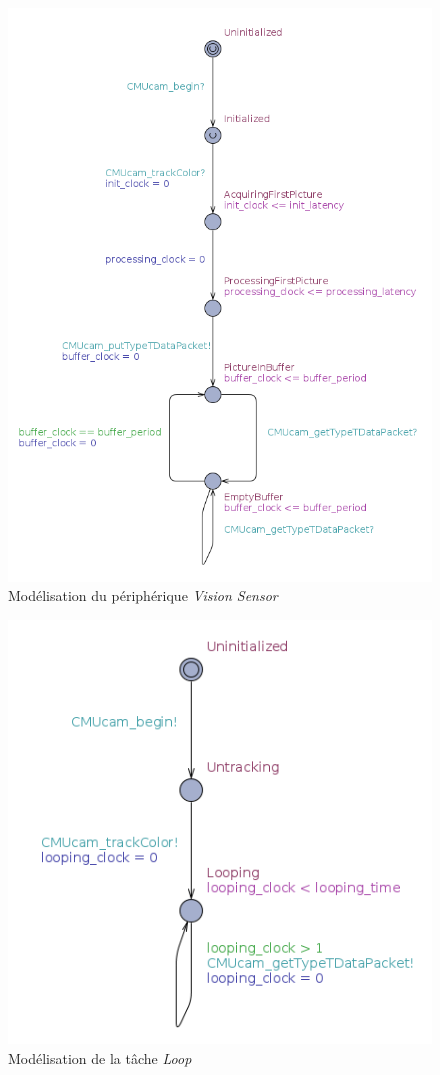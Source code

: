     \begin{figure}[!ht]
      \centering
      \includegraphics[scale=0.5]{./img/uppaal-camera.png}
      \caption{Modélisation du périphérique {\it Vision Sensor}}
    \end{figure}

    \begin{figure}[!ht]
      \centering
      \includegraphics[scale=0.5]{./img/uppaal-loop.png}
      \caption{Modélisation de la tâche {\it Loop}}
    \end{figure}

